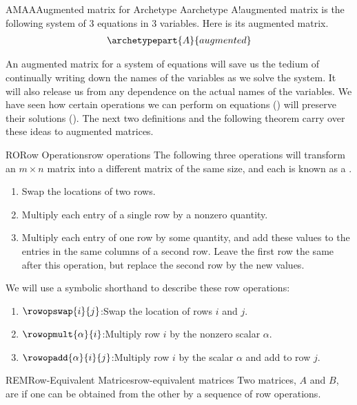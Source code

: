 %
\begin{example}{AMAA}{Augmented matrix for Archetype A}{archetype A!augmented matrix}
 is the following system of 3 equations in 3 variables.
Here is its augmented matrix.
\begin{align*}
\archetypepart{A}{augmented}
\end{align*}
\end{example}
%
%
An augmented matrix for a system of equations will save us the tedium of continually writing down the names of the variables as we solve the system.  It will also release us from any dependence on the actual names of the variables.  We have seen how certain operations we can perform on equations () will preserve their solutions ().  The next two definitions and the following theorem carry over these ideas to augmented matrices.
%
\begin{definition}{RO}{Row Operations}{row operations}
The following three operations will transform an $m\times n$ matrix into a different matrix of the same size, and each is known as a .
%
\begin{enumerate}
\item Swap the locations of two rows.
\item Multiply each entry of a single row by a nonzero quantity.
\item Multiply each entry of one row by some quantity, and add these values to the entries in the same columns of a second row.  Leave the first row the same after this operation, but replace the second row by the new values.
\end{enumerate}
We will use a symbolic shorthand to describe these row operations:
\begin{enumerate}
\item $\rowopswap{i}{j}$:\quad Swap the location of rows $i$ and $j$.
\item $\rowopmult{\alpha}{i}$:\quad Multiply row $i$ by the nonzero scalar $\alpha$.
\item $\rowopadd{\alpha}{i}{j}$:\quad Multiply row $i$ by the scalar $\alpha$ and add to row $j$.
\end{enumerate}
\end{definition}
%
\begin{definition}{REM}{Row-Equivalent Matrices}{row-equivalent matrices}
Two matrices, $A$ and $B$, are  if one can be obtained from the other by a sequence of row operations.
\end{definition}
